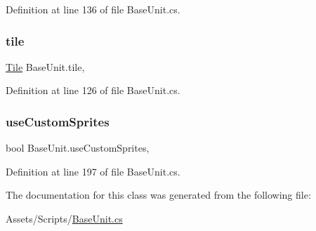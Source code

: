 Definition at line 136 of file Base\+Unit.\+cs.

\mbox{\label{class_base_unit_accbce29bc34e46e47cbcc82abc24597f}} 
\subsubsection{\texorpdfstring{tile}{tile}}
{\footnotesize\ttfamily \mbox{\hyperlink{class_tile}{Tile}} Base\+Unit.\+tile\hspace{0.3cm}{\ttfamily [get]}, {\ttfamily [set]}}



Definition at line 126 of file Base\+Unit.\+cs.

\mbox{\label{class_base_unit_a6c81f225b4030b9f4d21f410f9667047}} 
\subsubsection{\texorpdfstring{useCustomSprites}{useCustomSprites}}
{\footnotesize\ttfamily bool Base\+Unit.\+use\+Custom\+Sprites\hspace{0.3cm}{\ttfamily [get]}, {\ttfamily [set]}}



Definition at line 197 of file Base\+Unit.\+cs.



The documentation for this class was generated from the following file\+:\begin{DoxyCompactItemize}
\item 
Assets/\+Scripts/\mbox{\hyperlink{_base_unit_8cs}{Base\+Unit.\+cs}}\end{DoxyCompactItemize}
